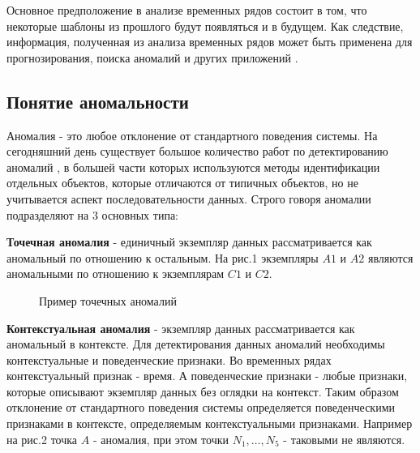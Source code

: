 \documentclass[14pt, a4paper]{extarticle}
\begin{document}
	 Основное предположение в анализе временных рядов состоит в том, что некоторые шаблоны из прошлого будут появляться и в будущем. Как следствие, информация, полученная из анализа временных рядов может быть применена для прогнозирования, поиска аномалий и других приложений \cite{cite2}.  
	 	
	\subsection{Понятие аномальности}
	 Аномалия - это любое отклонение от стандартного поведения системы. На сегодняшний день существует большое количество работ по детектированию аномалий \cite{cite3}, в большей части которых используются методы идентификации отдельных объектов, которые отличаются от типичных объектов, но не учитывается аспект последовательности данных. Строго говоря аномалии подразделяют на 3 основных типа:
	 
	 \textbf{Точечная аномалия} - единичный экземпляр данных рассматривается как аномальный по отношению к остальным. На рис.1 экземпляры $A1$ и $A2$ являются аномальными по отношению к экземплярам $C1$ и $C2$.
	\begin{figure}[H]
		\centerline{} 
		\caption{Пример точечных аномалий}
	\end{figure} 	
	
	 \textbf{Контекстуальная аномалия} - экземпляр данных рассматривается как аномальный в контексте. Для детектирования  данных аномалий необходимы контекстуальные и поведенческие признаки.  Во временных рядах  контекстуальный признак - время. А поведенческие признаки - любые признаки, которые описывают экземпляр данных без оглядки на контекст. Таким образом  отклонение от стандартного поведения системы определяется поведенческими признаками в контексте, определяемым контекстуальными признаками. Например на рис.2 точка $A$  - аномалия, при этом  точки $N_1, \dots, N_5$ - таковыми не являются. 
	
\end{document}
